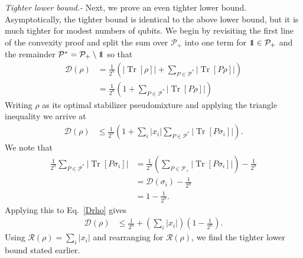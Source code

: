 \documentclass[aps,prl,twocolumn,showpacs,superscriptaddress,groupedaddress,amsmath,amssymb]{revtex4-1}  %
\DeclareMathOperator{\Tr}{Tr}
\newcommand{\Pplus}{\ensuremath{\mathcal{P}_{+}}}
\newcommand{\Pstar}{\ensuremath{\mathcal{P}^*}}
\def\id{\mbox{\small 1} \!\! \mbox{1}}
\newcommand{\tr}{\ensuremath{\mathrm{\Tr}}}
\begin{document}
\noindent\textit{Tighter lower bound.-} Next, we prove an even tighter lower bound.  Asymptotically, the tighter bound is identical to the above lower bound, but it is much tighter for modest numbers of qubits.  We begin by revisiting the first line of the convexity proof and split the sum over $\Pplus$ into one term for $\id \in \Pplus$   and the remainder $\Pstar=\Pplus \setminus \id$ so that
\begin{align}
\label{Drho}
	\mathcal{D}(\rho)  &= \frac{1}{2^n} \left(|\tr[ \rho ] | + \sum_{P \in \Pstar} |\tr[ P \rho ] |  \right) \\ \nonumber
	 &= \frac{1}{2^n} \left(1 + \sum_{P \in \Pstar} |\tr[ P \rho ] |  \right) 
\end{align}
Writing $\rho$ as its optimal stabilizer pseudomixture and applying the triangle inequality we arrive at
\begin{align}
	\mathcal{D}(\rho)  & \leq \frac{1}{2^n} \left(1 + \sum_i |x_i|\sum_{P \in \Pstar}  |\tr[ P \sigma_i ] |  \right) .
\end{align}
We note that
\begin{align}
	\frac{1}{2^n}	\sum_{P \in \Pstar}  |\tr[ P \sigma_i ] | & = \frac{1}{2^n}\left( \sum_{P \in \Pplus}  |\tr[ P \sigma_i ] | \right) - \frac{1}{2^n} \\ \nonumber
& = \mathcal{D}(\sigma_i) - \frac{1}{2^n} \\ \nonumber
& = 1 - \frac{1}{2^n} .
\end{align}
Applying this to Eq.~\eqref{Drho} gives
\begin{align}
	\mathcal{D}(\rho)  & \leq \frac{1}{2^n} + \left( \sum_i |x_i| \right) \left(1 -  \frac{1}{2^n} \right) .
\end{align}
Using $\mathcal{R}(\rho)=\sum_i |x_i|$ and rearranging for $\mathcal{R}(\rho)$, we find the tighter lower bound stated earlier.
\end{document}
